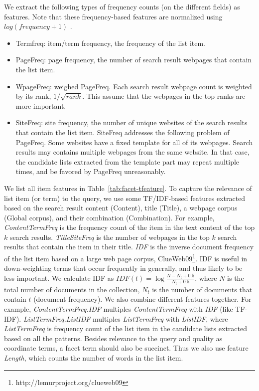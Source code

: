 We extract the following types of frequency counts (on the different fields) as features. Note that these frequency-based features are normalized using $log(frequency+1)$ .
\begin{itemize}
 \item Termfreq: item/term frequency, the frequency of the list item.
 \item PageFreq: page frequency, the number of search result webpages that contain the list item.
 \item WpageFreq: weighed PageFreq. Each search result webpage count is weighted by its rank, $1/\sqrt{rank}$. This assume that the webpages in the top ranks are more important.
 \item SiteFreq: site frequency, the number of unique websites of the search results that contain the list item. SiteFreq addresses the following problem of PageFreq. Some websites have a fixed template for all of its webpages.  Search results may contains multiple webpages from the same website. In that case, the candidate lists extracted from the template part may repeat multiple times, and be favored by PageFreq unreasonably.  
\end{itemize}

We list all item features in Table~\ref{tab:facet-tfeature}. To capture the relevance of list item (or term) to the query, we use some TF/IDF-based features extracted based on the search result content (Content), title (Title), a webpage corpus (Global corpus), and their combination (Combination). For example, \textit{ContentTermFreq} is the frequency count of the item in the text content of the top $k$ search results. \textit{TitleSiteFreq} is the number of webpages in the top $k$ search results that contain the item in their title. \textit{IDF} is the inverse document frequency of the list item based on a large web page corpus, ClueWeb09\footnote{http://lemurproject.org/clueweb09}. IDF is useful in down-weighting terms that occur frequently in generally, and thus likely to be less important. We calculate IDF as $IDF(t)=\log{\frac{N-N_{t}+0.5}{N_t+0.5}}$, where $N$ is the total number of documents in the collection, $N_t$ is the number of documents that contain $t$ (document frequency). We also combine 
different 
features together. For example, \textit{ContentTermFreq.IDF} multiples \textit{ContentTermFreq} with \textit{IDF} (like TF-IDF). \textit{ListTermFreq.ListIDF} multiples \textit{ListTermFreq} with \textit{ListIDF}, where \textit{ListTermFreq} is frequency count of the list item in the candidate lists extracted based on all the patterns. Besides relevance to the 
query and quality as coordinate terms, a facet term should also be succinct. Thus we also use feature \textit{Length}, which counts the number of words in the list item.


